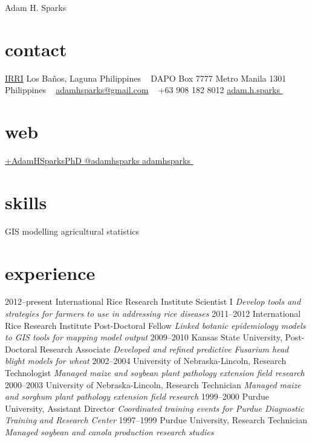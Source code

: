 
\hfill {\Huge Adam H. Sparks}

\begin{aside}
\small{\section{contact}
\href{http://www.irri.org/}{IRRI}
Los Ba\~nos, Laguna
Philippines
~
DAPO Box 7777
Metro Manila
1301 Philippines
~
\href{mailto:adamhsparks@gmail.com}{adamhsparks@gmail.com}
~
+63 908 182 8012  \faMobilePhone
{\href{skype:adam.h.sparks?call}{adam.h.sparks }}
~
\section{web}
\href{https://plus.google.com/+AdamHSparksPhD}{+AdamHSparksPhD {\color{google.plus}\faGooglePlusSign}}
\href{https://www.twitter.com/adamhsparks/}{@adamhsparks {\color{twitter.blue}\faTwitter}}
\href{https://github.com/adamhsparks/}{adamhsparks \faGithub}
~
\section{skills}
GIS
modelling
agricultural statistics}
\end{aside}

\section*{experience}
\begin{entrylist}
  \entry
    {2012--present}
    {International Rice Research Institute }
    {Scientist I}
    {\emph{Develop tools and strategies for farmers to use in addressing rice diseases}}
  \entry
    {2011--2012}
    {International Rice Research Institute }
    {Post-Doctoral Fellow}
    {\emph{Linked botanic epidemiology models to GIS tools for mapping model output}}
  \entry
    {2009--2010}
    {Kansas State University, }
    {Post-Doctoral Research Associate}
    {\emph{Developed and refined predictive Fusarium head blight models for wheat}}
  \entry
   {2002--2004}
   {University of Nebraska-Lincoln, }
   {Research Technologist}
   {\emph{Managed maize and soybean plant pathology extension field research}}
  \entry
   {2000--2003}
   {University of Nebraska-Lincoln, }
   {Research Technician}
   {\emph{Managed maize and sorghum plant pathology extension field research}}
  \entry
   {1999--2000}
   {Purdue University, }
   {Assistant Director}
   {\emph{Coordinated training events for Purdue Diagnostic Training and Research Center}}
  \entry
   {1997--1999}
   {Purdue University, }
   {Research Technician}
   {\emph{Managed soybean and canola production research studies}}
\end{entrylist}

